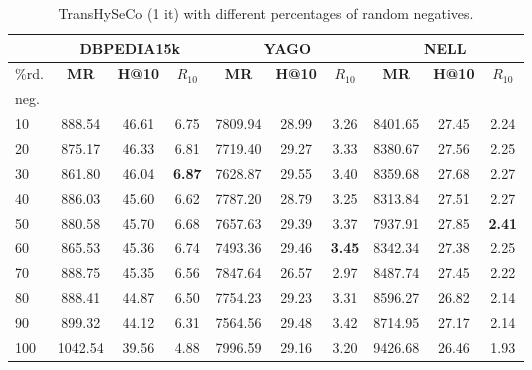 \documentclass[sigconf]{acmart}
\newcommand{\TransHI}{TransHySeCo\xspace}
\begin{document}
\begin{scriptsize}
\begin{table}[t]
\caption{TransHySeCo (1 it) with different percentages of random negatives.}
\label{tab:random component}
\begin{tabular}{|l|c|c|c|c|c|c|c|c|c|}
\hline
\multicolumn{1}{|c|}{} & \multicolumn{3}{c|}{\textbf{DBPEDIA15k}} & \multicolumn{3}{c|}{\textbf{YAGO}} & \multicolumn{3}{c|}{\textbf{NELL}} \\
\hline
\%rd.& \textbf{MR} & \textbf{H@10} & \textbf{\(R_{10}\)} & \textbf{MR} & \textbf{H@10} & \textbf{\(R_{10}\)} & \textbf{MR} & \textbf{H@10} & \textbf{\(R_{10}\)} \\
neg.&  &  &  & &  &  & & &  \\
\hline
10 & 888.54 & 46.61 & 6.75 & 7809.94 & 28.99 & 3.26 & 8401.65 & 27.45 & 2.24 \\\hline
20 & 875.17 & 46.33 & 6.81 & 7719.40 & 29.27 & 3.33 & 8380.67 & 27.56 & 2.25 \\\hline
30 & \cellcolor{lightgray}861.80 & \cellcolor{lightgray}46.04 & \cellcolor{lightgray}\textbf{6.87} & 7628.87 & 29.55 & 3.40 & 8359.68 & 27.68 & 2.27 \\\hline
40 & 886.03 & 45.60 & 6.62 & 7787.20 & 28.79 & 3.25 & 8313.84 & 27.51 & 2.27 \\\hline
50 & 880.58 & 45.70 & 6.68 & 7657.63 & 29.39 & 3.37 & \cellcolor{lightgray}7937.91 & \cellcolor{lightgray}27.85 & \cellcolor{lightgray}\textbf{2.41} \\\hline
60 & 865.53 & 45.36 & 6.74 & \cellcolor{lightgray}7493.36 & \cellcolor{lightgray}29.46 & \cellcolor{lightgray}\textbf{3.45} & 8342.34 & 27.38 & 2.25 \\\hline
70 & 888.75 & 45.35 & 6.56 & 7847.64 & 26.57 & 2.97 & 8487.74 & 27.45 & 2.22 \\\hline
80 & 888.41 & 44.87 & 6.50 & 7754.23 & 29.23 & 3.31 & 8596.27 & 26.82 & 2.14 \\\hline
90 & 899.32 & 44.12 & 6.31 & 7564.56 & 29.48 & 3.42 & 8714.95 & 27.17 & 2.14 \\\hline
100 & 1042.54 & 39.56 & 4.88 & 7996.59 & 29.16 & 3.20 & 9426.68 & 26.46 & 1.93 \\
\hline
\end{tabular}
\end{table}
\end{scriptsize}

\end{document}
